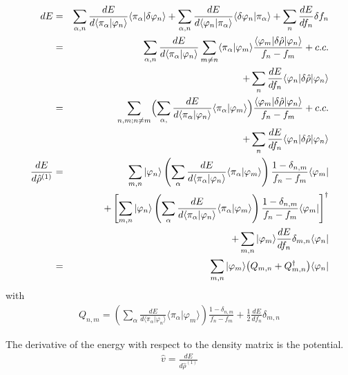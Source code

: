 \documentclass[11pt,a4paper]{report}
\begin{document}
\begin{eqnarray}
dE
&=&
\sum_{\alpha,n}
\frac{dE}{d\langle\pi_\alpha|\varphi_n\rangle}
\langle\pi_\alpha|\delta\varphi_n\rangle
+\sum_{\alpha,n}
\frac{dE}{d\langle\varphi_n|\pi_\alpha\rangle}
\langle\delta\varphi_n|\pi_\alpha\rangle
+\sum_n\frac{dE}{d f_n}\delta{f}_n
\nonumber\\
&=&
\sum_{\alpha,n}
\frac{dE}{d\langle\pi_\alpha|\varphi_n\rangle}
\sum_{m\neq n}
\langle\pi_\alpha|\varphi_m\rangle
\frac{\langle\varphi_m|\delta\hat{\rho}|\varphi_n\rangle}{f_n-f_m}
+c.c.
\nonumber\\
&&+\sum_n\frac{dE}{d f_n}\langle\varphi_n|\delta\hat{\rho}|\varphi_n\rangle
\nonumber\\
&=&
\sum_{n,m;n\neq m}
\Bigl(\sum_{\alpha,}
\frac{dE}{d\langle\pi_\alpha|\varphi_n\rangle}
\langle\pi_\alpha|\varphi_m\rangle\Bigr)
\frac{\langle\varphi_m|\delta\hat{\rho}|\varphi_n\rangle}{f_n-f_m}
+c.c.
\nonumber\\
&&+\sum_n\frac{dE}{d f_n}\langle\varphi_n|\delta\hat{\rho}|\varphi_n\rangle
\nonumber\\
%
%
\frac{dE}{d\hat{\rho}^{(1)}}
&=&
\sum_{m,n}|\varphi_n\rangle
\left(\sum_{\alpha}\frac{dE}{d\langle\pi_\alpha|\varphi_n\rangle}
\langle\pi_\alpha|\varphi_m\rangle\right)
\frac{1-\delta_{n,m}}{f_n-f_m}
\langle\varphi_m|
\nonumber\\
&&+
\left[\sum_{m, n}|\varphi_n\rangle
\left(\sum_{\alpha}\frac{dE}{d\langle\pi_\alpha|\varphi_n\rangle}
\langle\pi_\alpha|\varphi_m\rangle\right)
\frac{1-\delta_{n,m}}{f_n-f_m}
\langle\varphi_m|\right]^{\dagger}
\nonumber\\
&&+
\sum_{m,n}|\varphi_m\rangle\frac{dE}{df_n}\delta_{m,n}\langle\varphi_n|
\nonumber\\
&=&\sum_{m,n}|\varphi_m\rangle\bigl(Q_{m,n}+Q^{\dagger}_{m,n}\bigr)
\langle\varphi_n|
\end{eqnarray}
with
\begin{eqnarray}
Q_{n,m}=\left(\sum_{\alpha}\frac{dE}{d\langle\pi_\alpha|\varphi_n\rangle}
\langle\pi_\alpha|\varphi_m\rangle\right)
\frac{1-\delta_{n,m}}{f_n-f_m}
+\frac{1}{2}\frac{dE}{df_n}\delta_{m,n}
\end{eqnarray}

The derivative of the energy with respect to the density matrix is the
potential.
\begin{eqnarray}
\hat{v}=\frac{dE}{d\hat{\rho}^{(1)}}
\end{eqnarray}


\end{document}
